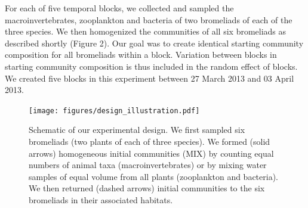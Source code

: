 For each of five temporal blocks, we collected and sampled the
macroinvertebrates, zooplankton and bacteria of two bromeliads of each
of the three species. We then homogenized the communities of all six
bromeliads as described shortly (Figure 2). Our goal was to create
identical starting community composition for all bromeliads within a
block. Variation between blocks in starting community composition is
thus included in the random effect of blocks. We created five blocks in
this experiment between 27 March 2013 and 03 April 2013.

\begin{figure}[htbp]
\centering
\texttt{[image: figures/design\_illustration.pdf]}
\caption[Schematic of experimental design.]{Schematic of our experimental design. We first sampled six bromeliads (two plants of each of three species). We formed (solid
arrows) homogeneous initial communities (MIX) by counting equal numbers
of animal taxa (macroinvertebrates) or by mixing water samples of equal
volume from all plants (zooplankton and bacteria). We then returned
(dashed arrows) initial communities to the six bromeliads in their
associated habitats.}
\label{fig:schematic}
\end{figure}

